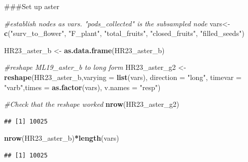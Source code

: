 \documentclass[
]{article}
\newenvironment{Shaded}{\begin{snugshade}}{\end{snugshade}}
\newcommand{\AttributeTok}[1]{\textcolor[rgb]{0.13,0.29,0.53}{#1}}
\newcommand{\CommentTok}[1]{\textcolor[rgb]{0.56,0.35,0.01}{\textit{#1}}}
\newcommand{\DecValTok}[1]{\textcolor[rgb]{0.00,0.00,0.81}{#1}}
\newcommand{\FunctionTok}[1]{\textcolor[rgb]{0.13,0.29,0.53}{\textbf{#1}}}
\newcommand{\NormalTok}[1]{#1}
\newcommand{\OtherTok}[1]{\textcolor[rgb]{0.56,0.35,0.01}{#1}}
\newcommand{\SpecialCharTok}[1]{\textcolor[rgb]{0.81,0.36,0.00}{\textbf{#1}}}
\newcommand{\StringTok}[1]{\textcolor[rgb]{0.31,0.60,0.02}{#1}}
\begin{document}
\#\#\#Set up aster

\begin{Shaded}
\begin{Highlighting}[]
\CommentTok{\#establish nodes as vars. "pods\_collected" is the subsampled node}
\NormalTok{vars}\OtherTok{\textless{}{-}}\FunctionTok{c}\NormalTok{(}\StringTok{"surv\_to\_flower"}\NormalTok{, }\StringTok{"F\_plant"}\NormalTok{, }\StringTok{"total\_fruits"}\NormalTok{, }\StringTok{"closed\_fruits"}\NormalTok{, }\StringTok{"filled\_seeds"}\NormalTok{)}

\NormalTok{HR23\_aster\_b }\OtherTok{\textless{}{-}} \FunctionTok{as.data.frame}\NormalTok{(HR23\_aster\_b)}

\CommentTok{\#reshape ML19\_aster\_b to long form}
\NormalTok{HR23\_aster\_g2 }\OtherTok{\textless{}{-}} \FunctionTok{reshape}\NormalTok{(HR23\_aster\_b,}\AttributeTok{varying =} \FunctionTok{list}\NormalTok{(vars), }\AttributeTok{direction =} \StringTok{"long"}\NormalTok{, }\AttributeTok{timevar =} \StringTok{"varb"}\NormalTok{,}\AttributeTok{times =} \FunctionTok{as.factor}\NormalTok{(vars), }\AttributeTok{v.names =} \StringTok{"resp"}\NormalTok{)}

\CommentTok{\#Check that the reshape worked }
\FunctionTok{nrow}\NormalTok{(HR23\_aster\_g2)}
\end{Highlighting}
\end{Shaded}

\begin{verbatim}
## [1] 10025
\end{verbatim}

\begin{Shaded}
\begin{Highlighting}[]
\FunctionTok{nrow}\NormalTok{(HR23\_aster\_b)}\SpecialCharTok{*}\FunctionTok{length}\NormalTok{(vars)}
\end{Highlighting}
\end{Shaded}

\begin{verbatim}
## [1] 10025
\end{verbatim}

\begin{Shaded}
\end{Shaded}
\end{document}
